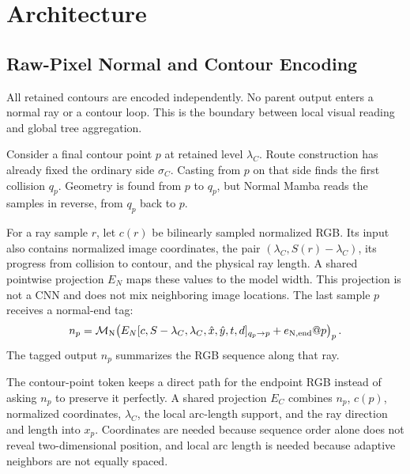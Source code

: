 \section{Architecture}
\label{sec:architecture}

\subsection{Raw-Pixel Normal and Contour Encoding}

All retained contours are encoded independently. No parent output enters a normal ray or a contour loop. This is the boundary between local visual reading and global tree aggregation.

Consider a final contour point $p$ at retained level $\lambda_C$. Route construction has already fixed the ordinary side $\sigma_C$. Casting from $p$ on that side finds the first collision $q_p$. Geometry is found from $p$ to $q_p$, but Normal Mamba reads the samples in reverse, from $q_p$ back to $p$.

For a ray sample $r$, let $c(r)$ be bilinearly sampled normalized RGB. Its input also contains normalized image coordinates, the pair $(\lambda_C,S(r)-\lambda_C)$, its progress from collision to contour, and the physical ray length. A shared pointwise projection $E_N$ maps these values to the model width. This projection is not a CNN and does not mix neighboring image locations. The last sample $p$ receives a normal-end tag:
\begin{equation}
n_p=\mathcal{M}_{\mathrm{N}}\!\left(E_N[c,S-\lambda_C,\lambda_C,\hat x,\hat y,t,d]_{q_p\rightarrow p}
+e_{\mathrm{N,end}}@p\right)_p.
\label{eq:normal}
\end{equation}
The tagged output $n_p$ summarizes the RGB sequence along that ray.

The contour-point token keeps a direct path for the endpoint RGB instead of asking $n_p$ to preserve it perfectly. A shared projection $E_C$ combines $n_p$, $c(p)$, normalized coordinates, $\lambda_C$, the local arc-length support, and the ray direction and length into $x_p$. Coordinates are needed because sequence order alone does not reveal two-dimensional position, and local arc length is needed because adaptive neighbors are not equally spaced.


